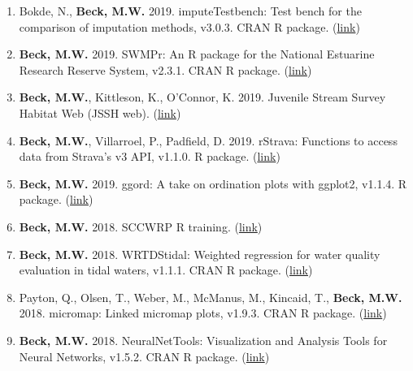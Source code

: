 \documentclass[letterpaper,12pt]{article}
\begin{document}
\begin{enumerate}

\item Bokde, N., \textbf{Beck, M.W.} 2019. imputeTestbench: Test bench for the comparison of imputation methods, v3.0.3. CRAN R package. ({\footnotesize\href{https://cran.r-project.org/web/packages/imputeTestbench/index.html}{link}})

\item \textbf{Beck, M.W.} 2019. SWMPr: An R package for the National Estuarine Research Reserve System, v2.3.1. CRAN R package. ({\footnotesize\href{https://cran.r-project.org/web/packages/SWMPr/index.html}{link}})

\item \textbf{Beck, M.W.}, Kittleson, K., O'Connor, K. 2019. Juvenile Stream Survey Habitat Web (JSSH web). ({\footnotesize\href{https://sccwrp.shinyapps.io/jssh_web/}{link}})

\item \textbf{Beck, M.W.}, Villarroel, P., Padfield, D. 2019. rStrava: Functions to access data from Strava's v3 API, v1.1.0. R package. ({\footnotesize\href{https://github.com/fawda123/rStrava}{link}})

\item \textbf{Beck, M.W.} 2019. ggord: A take on ordination plots with ggplot2, v1.1.4. R package. ({\footnotesize\href{https://github.com/fawda123/ggord}{link}})

\item \textbf{Beck, M.W.} 2018. SCCWRP R training. ({\footnotesize\href{https://sccwrp.github.io/SCCWRP_R_training/}{link}})

\item \textbf{Beck, M.W.} 2018. WRTDStidal: Weighted regression for water quality evaluation in tidal waters, v1.1.1. CRAN R package. ({\footnotesize\href{https://cran.r-project.org/web/packages/WRTDStidal/index.html}{link}})

\item Payton, Q., Olsen, T., Weber, M., McManus, M., Kincaid, T., \textbf{Beck, M.W.} 2018. micromap: Linked micromap plots, v1.9.3. CRAN R package. ({\footnotesize\href{https://cran.r-project.org/web/packages/micromap/index.html}{link}})

\item \textbf{Beck, M.W.} 2018. NeuralNetTools: Visualization and Analysis Tools for Neural Networks, v1.5.2. CRAN R package. ({\footnotesize\href{http://cran.r-project.org/web/packages/NeuralNetTools/}{link}})


\end{enumerate}
\end{document}
